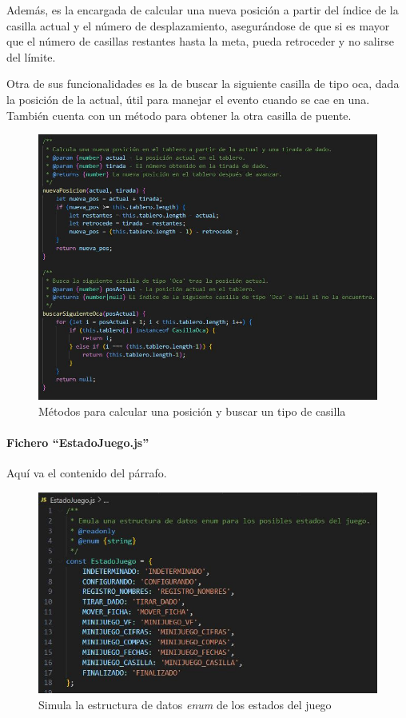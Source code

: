 Además, es la encargada de calcular una nueva posición a partir del índice de la casilla actual y el número de desplazamiento, asegurándose de que si es mayor que el número de casillas restantes hasta la meta, pueda retroceder y no salirse del límite.

Otra de sus funcionalidades es la de buscar la siguiente casilla de tipo oca, dada la posición de la actual, útil para manejar el evento cuando se cae en una. También cuenta con un método para obtener la otra casilla de puente.

\begin{figure}[H]
	\centering
	\includegraphics{imgs/codigo-tablero-2.jpg}
	\caption{Métodos para calcular una posición y buscar un tipo de casilla}
	\label{fig:codigo-tablero-2}
\end{figure}

\paragraph{Fichero \enquote{EstadoJuego.js}}

Aquí va el contenido del párrafo.

\begin{figure}[H]
	\centering
	\includegraphics{imgs/codigo-estado-1.jpg}
	\caption{Simula la estructura de datos \textit{enum} de los estados del juego}
	\label{fig:codigo-estado-1}
\end{figure}

